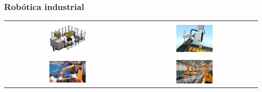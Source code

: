 \documentclass{beamer}
\begin{document}
\begin{frame}
\frametitle{Robótica industrial}
\begin{table}[htbp]
  \centering
  \begin{tabular}{cc}
      \includegraphics[width=0.3\textwidth, valign=m]{figs/robotica_industrial_jaula.png} & \includegraphics[width=0.3\textwidth, valign=m]{figs/robotica_industrial_adept.png} \\
      \includegraphics[width=0.3\textwidth, valign=m]{figs/robotica_industrial_soldadura.png} & \includegraphics[width=0.3\textwidth, valign=m]{figs/robotica_industrial_coches.png} 
  \end{tabular}
\end{table}
\end{frame}
\end{document}
